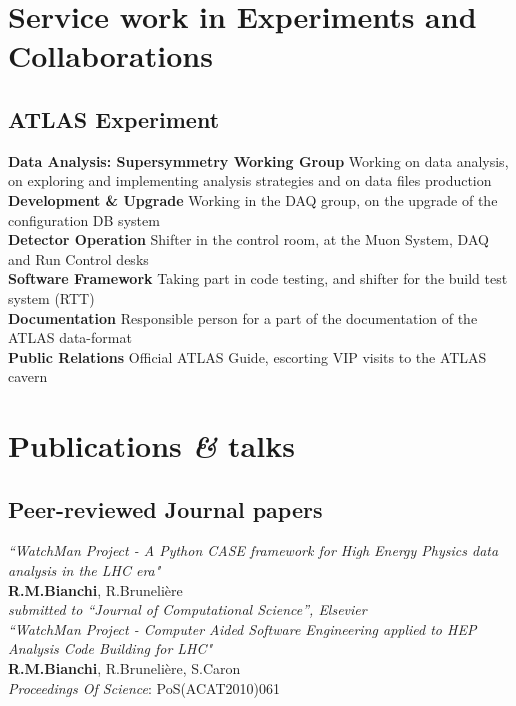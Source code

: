 \documentclass[10pt, a4paper]{article}
\newcommand{\amper}{{\fontspec[Scale=.95]{Fontin}\selectfont\itshape\&}}
\begin{document}

\section*{Service work in Experiments and Collaborations}
\subsection*{ATLAS Experiment}
\noindent
\textbf{Data Analysis: Supersymmetry Working Group} Working on data analysis, on exploring and implementing analysis strategies and on data files production\\
\textbf{Development \& Upgrade} Working in the DAQ group, on the upgrade of the configuration DB system\\
\textbf{Detector Operation} Shifter in the control room, at the Muon System, DAQ and Run Control desks\\
\textbf{Software Framework} Taking part in code testing, and shifter for the build test system (RTT)\\
\textbf{Documentation} Responsible person for a part of the documentation of the ATLAS data-format\\
\textbf{Public Relations} Official ATLAS Guide, escorting VIP visits to the ATLAS cavern\\


\section*{Publications \amper{} talks}
\setcounter{subsection}{0}

\subsection{Peer-reviewed Journal papers}
\noindent

\textit{``WatchMan Project - A Python CASE framework for High Energy Physics data analysis in the LHC era"}\\
\textbf {R.M.Bianchi}, R.Brunelière\\
\emph{\small submitted to ``Journal of Computational Science'', Elsevier}\\


\textit{``WatchMan Project - Computer Aided Software Engineering applied to HEP Analysis Code Building for LHC"}\\
\textbf {R.M.Bianchi}, R.Brunelière, S.Caron\\
\emph{Proceedings Of Science}:   PoS(ACAT2010)061\\
\end{document}
